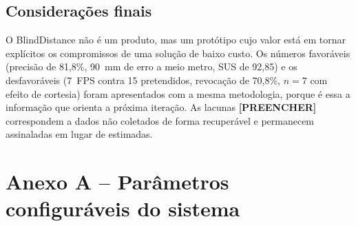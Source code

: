 \documentclass[12pt]{article}
\begin{document}
\subsection{Considerações finais}

O BlindDistance não é um produto, mas um protótipo cujo valor está em tornar
explícitos os compromissos de uma solução de baixo custo. Os números
favoráveis (precisão de 81,8\%, 90~mm de erro a meio metro, SUS de 92,85) e os
desfavoráveis (7~FPS contra 15 pretendidos, revocação de 70,8\%, $n = 7$ com
efeito de cortesia) foram apresentados com a mesma metodologia, porque é essa
a informação que orienta a próxima iteração. As lacunas \textbf{[PREENCHER]}
correspondem a dados não coletados de forma recuperável e permanecem
assinaladas em lugar de estimadas.




\appendix
\section*{Anexo A -- Parâmetros configuráveis do sistema}
\end{document}
